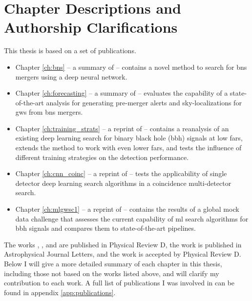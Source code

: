 \chapter{Chapter Descriptions and Authorship Clarifications}
This thesis is based on a set of publications.
\begin{itemize}
	\item Chapter \ref{ch:bns} -- a summary of \cite{Schafer:2020kor} -- contains a novel method to search for \acrshort{bns} mergers using a deep neural network.
	\item Chapter \ref{ch:forecasting} -- a summary of \cite{Nitz:2020vym} -- evaluates the capability of a state-of-the-art analysis for generating pre-merger alerts and sky-localizations for \acrshort{gw}s from \acrshort{bns} mergers.
	\item Chapter \ref{ch:training_strats} -- a reprint of \cite{Schafer:2021fea} -- contains a reanalysis of an existing deep learning search for binary black hole (\acrshort{bbh}) signals at low \acrshort{far}s, extends the method to work with even lower \acrshort{far}s, and tests the influence of different training strategies on the detection performance.
	\item Chapter \ref{ch:cnn_coinc} -- a reprint of \cite{Schafer:2021cml} -- tests the applicability of single detector deep learning search algorithms in a coincidence multi-detector search.
	\item Chapter \ref{ch:mlgwsc1} -- a reprint of \cite{Schafer:2022dxv} -- contains the results of a global mock data challenge that assesses the current capability of \acrshort{ml} search algorithms for \acrshort{bbh} signals and compares them to state-of-the-art pipelines.
\end{itemize}
The works \cite{Schafer:2020kor}, \cite{Schafer:2021fea}, and \cite{Schafer:2021cml} are published in Physical Review D, the work \cite{Nitz:2020vym} is published in Astrophysical Journal Letters, and the work \cite{Schafer:2022dxv} is accepted by Physical Review D. Below I will give a more detailed summary of each chapter in this thesis, including those not based on the works listed above, and will clarify my contribution to each work. A full list of publications I was involved in can be found in appendix \ref{app:publications}.

